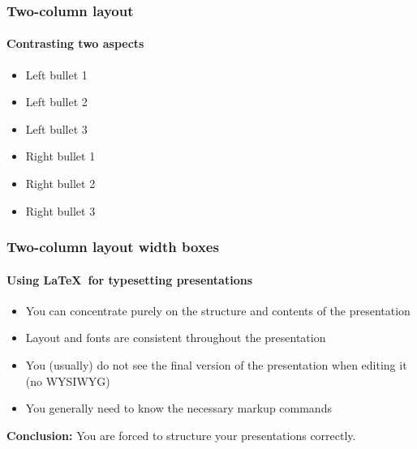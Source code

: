 \begin{frame}[t]
    \frametitle{Two-column layout}
    \framesubtitle{Contrasting two aspects}

    \twocolumnlayout
    {
        \begin{itemize}
            \item Left bullet 1
            \item Left bullet 2
            \item Left bullet 3
        \end{itemize}
    }{
        \begin{itemize}
            \item Right bullet 1
            \item Right bullet 2
            \item Right bullet 3
        \end{itemize}
    }
\end{frame}

\begin{frame}[t]
    \frametitle{Two-column layout width boxes}
    \framesubtitle{Using \LaTeX\ for typesetting presentations}

    \twocolumnlayout
    {
        \begin{block}{}
            \begin{itemize}
                \item You can concentrate purely on the structure and contents of the presentation
                \item Layout and fonts are consistent throughout the presentation
            \end{itemize}
        \end{block}
    }{
        \begin{block}{}
            \begin{itemize}
                \item You (usually) do not see the final version of the presentation when editing it (no WYSIWYG)
                \item You generally need to know the necessary markup commands
            \end{itemize}
        \end{block}
    }

    \vspace*{0.5em}
    \textbf{\textcolor{ercisred}{Conclusion:}} You are forced to structure your presentations correctly.
\end{frame}

